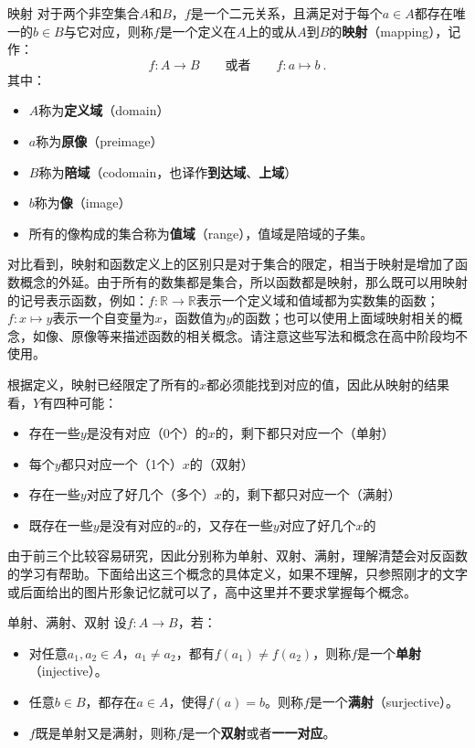 \begin{definition}{映射}
对于两个非空集合$A$和$B$，$f$是一个二元关系，且满足对于每个$a\in A$都存在唯一的$b\in B$与它对应，则称$f$是一个定义在$A$上的或从$A$到$B$的\textbf{映射}（mapping），记作：
\begin{equation}
f:A\to B\qquad\text{或者}\qquad f:a\mapsto b~.
\end{equation}
其中：
\begin{itemize}
\item $A$称为\textbf{定义域}（domain）
\item $a$称为\textbf{原像}（preimage）
\item $B$称为\textbf{陪域}（codomain，也译作\textbf{到达域}、\textbf{上域}）
\item $b$称为\textbf{像}（image）
\item 所有的像构成的集合称为\textbf{值域}（range），值域是陪域的子集。
\end{itemize}
\end{definition}

对比看到，映射和函数定义上的区别只是对于集合的限定，相当于映射是增加了函数概念的外延。由于所有的数集都是集合，所以函数都是映射，那么既可以用映射的记号表示函数，例如：$f: \mathbb R \to \mathbb R$表示一个定义域和值域都为实数集的函数；$f:x \mapsto y$表示一个自变量为$x$，函数值为$y$的函数；也可以使用上面域映射相关的概念，如像、原像等来描述函数的相关概念。请注意这些写法和概念在高中阶段均不使用。

根据定义，映射已经限定了所有的$x$都必须能找到对应的值，因此从映射的结果看，$Y$有四种可能：
\begin{itemize}
\item 存在一些$y$是没有对应（0个）的$x$的，剩下都只对应一个（单射）
\item 每个$y$都只对应一个（1个）$x$的（双射）
\item 存在一些$y$对应了好几个（多个）$x$的，剩下都只对应一个（满射）
\item 既存在一些$y$是没有对应的$x$的，又存在一些$y$对应了好几个$x$的
\end{itemize}

由于前三个比较容易研究，因此分别称为单射、双射、满射，理解清楚会对反函数的学习有帮助。下面给出这三个概念的具体定义，如果不理解，只参照刚才的文字或后面给出的图片形象记忆就可以了，高中这里并不要求掌握每个概念。

\begin{definition}{单射、满射、双射}
设$f:A\to{B}$，若：
\begin{itemize}
\item 对任意$a_1,a_2\in{A}$，$a_1\not={a_2}$，都有$f(a_1)\not={f(a_2)}$，则称$f$是一个\textbf{单射}（injective）。
\item 任意$b\in{B}$，都存在$a\in{A}$，使得$f(a)=b$。则称$f$是一个\textbf{满射}（surjective）。
\item $f$既是单射又是满射，则称$f$是一个\textbf{双射}或者\textbf{一一对应}。
\end{itemize}
\end{definition}

